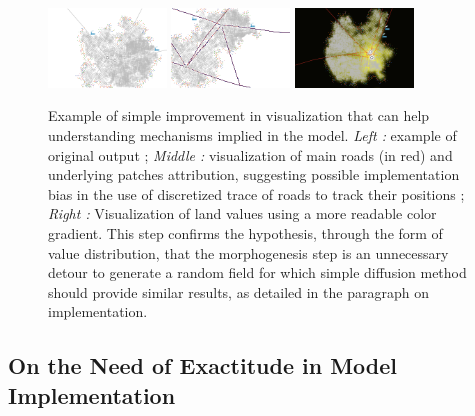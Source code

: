 \begin{figure}
\centering
\includegraphics[width=0.28\textwidth]{Figures/PartI/Methodology/Reproducibility/stdView}
\hfill
\includegraphics[width=0.28\textwidth]{Figures/PartI/Methodology/Reproducibility/ViewRoads}
\hfill
\includegraphics[width=0.28\textwidth]{Figures/PartI/Methodology/Reproducibility/landValues_cityFinished}
\caption[Reproducibility and explicit processes visualization]{Example of simple improvement in visualization that can help understanding mechanisms implied in the model. \textit{Left : } example of original output ; \textit{Middle : } visualization of main roads (in red) and underlying patches attribution, suggesting possible implementation bias in the use of discretized trace of roads to track their positions ; \textit{Right : }Visualization of land values using a more readable color gradient. This step confirms the hypothesis, through the form of value distribution, that the morphogenesis step is an unnecessary detour to generate a random field for which simple diffusion method should provide similar results, as detailed in the paragraph on implementation.}
\label{fig:example_tij_viz}
\end{figure}








\subsection{On the Need of Exactitude in Model Implementation}














